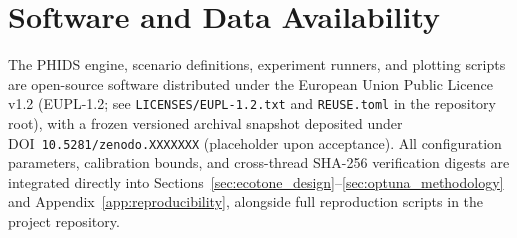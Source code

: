 \section*{Software and Data Availability}

The PHIDS engine, scenario definitions, experiment runners, and plotting scripts are open-source software distributed under the European Union Public Licence v1.2 (EUPL-1.2; see \texttt{LICENSES/EUPL-1.2.txt} and \texttt{REUSE.toml} in the repository root), with a frozen versioned archival snapshot deposited under DOI~\texttt{10.5281/zenodo.XXXXXXX} (placeholder upon acceptance). All configuration parameters, calibration bounds, and cross-thread SHA-256 verification digests are integrated directly into Sections~\ref{sec:ecotone_design}--\ref{sec:optuna_methodology} and Appendix~\ref{app:reproducibility}, alongside full reproduction scripts in the project repository.
